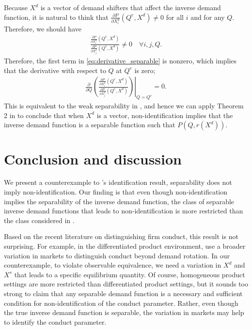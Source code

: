 \documentclass[11pt, a4paper]{article}
\theoremstyle{remark}
\begin{document}
Because $X^{d}$ is a vector of demand shifters that affect the inverse demand function, it is natural to think that $\frac{\partial P}{\partial X^{d}_{i}}(Q^e, X^{d}) \ne 0$ for all $i$ and for any $Q$.
Therefore, we should have
\begin{align}
    \frac{\frac{\partial P}{\partial X^{d}_{i}}(Q^e, X^{d})}{\frac{\partial P}{\partial X^{d}_{j}}(Q^e, X^{d})} \ne 0 \quad \forall i, j, Q.
\end{align}
Therefore, the first term in \eqref{eq:derivative_separable} is nonzero, which implies that the derivative with respect to $Q$ at $Q^e$ is zero;
\begin{align}
    \left. \frac{\partial}{\partial Q} \left(\frac{\frac{\partial P}{\partial X^{d}_{i}}(Q^e, X^{d})}{\frac{\partial P}{\partial X^{d}_{j}}(Q^e, X^{d})}\right) \right|_{Q = Q^e} = 0.
\end{align}
This is equivalent to the weak separability in \citet{goldmanNote1964}, and hence we can apply Theorem 2 in \citet{goldmanNote1964} to conclude that when $X^{d}$ is a vector, non-identification implies that the inverse demand function is a separable function such that $P(Q, r(X^{d}))$.


\section{Conclusion and discussion}

We present a counterexample to \citet{lau1982identifying}'s identification result, separability does not imply non-identification.
Our finding is that even though non-identification implies the separability of the inverse demand function, the class of separable inverse demand functions that leads to non-identification is more restricted than the class considered in \citet{lau1982identifying}.

Based on the recent literature on distinguishing firm conduct, this result is not surprising.
For example, in the differentiated product environment, \citet{berry2014identification}  use a broader variation in markets to distinguish conduct beyond demand rotation.
In our counterexample, to violate observable equivalence, we need a variation in $X^{d}$ and $X^{s}$ that leads to a specific equilibrium quantity.
Of course, homogeneous product settings are more restricted than differentiated product settings, but it sounds too strong to claim that any separable demand function is a necessary and sufficient condition for non-identification of the conduct parameter.
Rather, even though the true inverse demand function is separable, the variation in markets may help to identify the conduct parameter.
\end{document}
